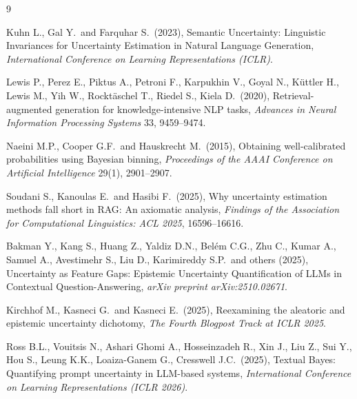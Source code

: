 \documentclass[10pt,twoside]{article}
\numberwithin{equation}{section}
\begin{document}
\begin{thebibliography}{9}




Kuhn L., Gal Y.\ and Farquhar S.\ (2023), Semantic Uncertainty: Linguistic Invariances for Uncertainty Estimation in Natural Language Generation, \textit{International Conference on Learning Representations (ICLR)}.




Lewis P., Perez E., Piktus A., Petroni F., Karpukhin V., Goyal N., K\"{u}ttler H., Lewis M., Yih W., Rockt\"{a}schel T., Riedel S., Kiela D.\ (2020), Retrieval-augmented generation for knowledge-intensive NLP tasks, \textit{Advances in Neural Information Processing Systems} 33, 9459--9474.




Naeini M.P., Cooper G.F.\ and Hauskrecht M.\ (2015), Obtaining well-calibrated probabilities using Bayesian binning, \textit{Proceedings of the AAAI Conference on Artificial Intelligence} 29(1), 2901--2907.




Soudani S., Kanoulas E.\ and Hasibi F.\ (2025), Why uncertainty estimation methods fall short in RAG: An axiomatic analysis, \textit{Findings of the Association for Computational Linguistics: ACL 2025}, 16596--16616.




Bakman Y., Kang S., Huang Z., Yaldiz D.N., Bel\'em C.G., Zhu C., Kumar A., Samuel A., Avestimehr S., Liu D., Karimireddy S.P.\ and others (2025), Uncertainty as Feature Gaps: Epistemic Uncertainty Quantification of LLMs in Contextual Question-Answering, \textit{arXiv preprint arXiv:2510.02671}.




Kirchhof M., Kasneci G.\ and Kasneci E.\ (2025), Reexamining the aleatoric and epistemic uncertainty dichotomy, \textit{The Fourth Blogpost Track at ICLR 2025}.




Ross B.L., Vouitsis N., Ashari Ghomi A., Hosseinzadeh R., Xin J., Liu Z., Sui Y., Hou S., Leung K.K., Loaiza-Ganem G., Cresswell J.C.\ (2025), Textual Bayes: Quantifying prompt uncertainty in LLM-based systems, \textit{International Conference on Learning Representations (ICLR 2026)}.



\end{thebibliography}
\end{document}
